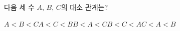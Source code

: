 다음 세 수 $A$, $B$, $C$의 대소 관계는?
\begin{choicesii}{$A<B<C$}{$A<C<B$}{$B<A<C$}{$B<C<A$}{$C<A<B$}\end{choicesii}
